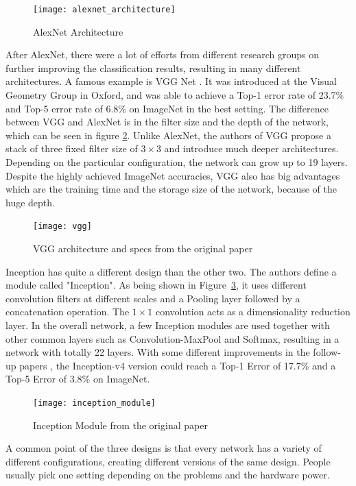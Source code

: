 \begin{figure}[h]
  \centering
  \texttt{[image: alexnet\_architecture]}
  \caption{AlexNet Architecture \cite{alexnet}}
  \label{fig:alexnet}
\end{figure}

After AlexNet, there were a lot of efforts from different research groups on further
improving the classification results, resulting in many different architectures. A famous
example is VGG Net \cite{vgg}. It was introduced at the Visual Geometry Group in Oxford,
and was able to achieve a Top-1 error rate of 23.7\% and Top-5 error rate of 6.8\% on
ImageNet in the best setting. The difference between VGG and AlexNet is in the filter size
and the depth of the network, which can be seen in figure \ref{fig:vgg}. Unlike AlexNet,
the authors of VGG propose a stack of three fixed filter size of $3 \times 3$ and
introduce much deeper architectures. Depending on the particular configuration, the
network can grow up to 19 layers. Despite the highly achieved ImageNet accuracies, VGG
also has big advantages which are the training time and the storage size of the network,
because of the huge depth.

\begin{figure}[h]
	\centering
	\texttt{[image: vgg]}
	\caption{VGG architecture and specs from the original paper \cite{vgg}}
	\label{fig:vgg}
\end{figure}

Inception \cite{inception1} has quite a different design than the other two. The authors
define a module called "Inception". As being shown in Figure~\ref{fig:inception_module},
it uses different convolution filters at different scales and a Pooling layer followed by
a concatenation operation. The $1 \times 1$ convolution acts as a dimensionality reduction
layer. In the overall network, a few Inception modules are used together with other common
layers such as Convolution-MaxPool and Softmax, resulting in a network with totally 22
layers. With some different improvements in the follow-up papers \cite{inception2,
inception3}, the Inception-v4 version could reach a Top-1 Error of 17.7\% and a Top-5
Error of 3.8\% on ImageNet. 

\begin{figure}[h!]
	\centering
	\texttt{[image: inception\_module]}
	\caption{Inception Module from the original paper \cite{inception1}}
	\label{fig:inception_module}
\end{figure}

A common point of the three designs is that every network has a variety of different
configurations, creating different versions of the same design. People usually pick one
setting depending on the problems and the hardware power.


